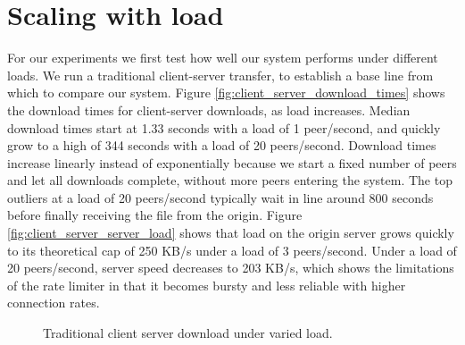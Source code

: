 \section{Scaling with load}

For our experiments we first test how well our system performs under different loads.
We run a traditional client-server transfer, to establish a base line from which to compare 
our system. Figure \ref{fig:client_server_download_times} shows the download times for client-server 
downloads, as load increases.  Median download times start at 1.33 seconds with a load of 1 peer/second,
and quickly grow to a high of 344 seconds with a load of 20 peers/second. Download times increase linearly instead 
of exponentially because we start a fixed number of peers and let all downloads complete, without more peers
entering the system.
The top outliers at a load of 20 peers/second typically wait in line around 800 seconds before 
finally receiving the file from the origin. Figure \ref{fig:client_server_server_load} shows that load on the origin server grows quickly to its 
theoretical cap of 250 KB/s under a load of 3 peers/second. Under a load of 20 peers/second, server speed decreases to 203 KB/s, which 
shows the limitations of the rate limiter in that it becomes bursty and less reliable with higher connection rates.

\begin{figure}
  \begin{center}
    \caption{Traditional client server download under varied load.}  
  \end{center}
\end{figure}


